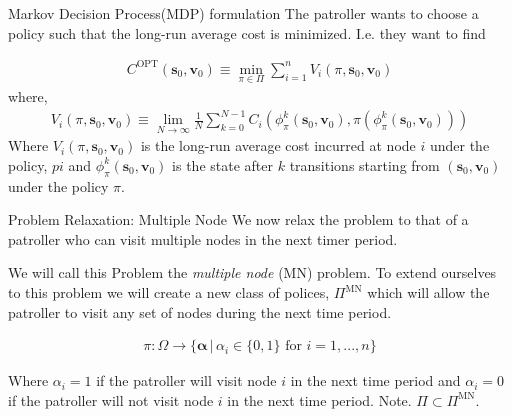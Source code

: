 \documentclass[10pt]{beamer}
\begin{document}
\begin{frame}{Markov Decision Process(MDP) formulation}
The patroller wants to choose a policy such that the long-run average cost is minimized. I.e. they want to find

\begin{align*}
C^{\text{OPT}}(\bm{s}_{0},\bm{v}_{0}) \equiv \min\limits_{\pi \in \Pi} \sum\limits_{i=1}^{n} V_{i}(\pi,\bm{s}_{0},\bm{v}_{0})
\end{align*}
where,
\begin{align*}
V_{i}(\pi,\bm{s}_{0},\bm{v}_{0}) \equiv \lim\limits_{N \rightarrow \infty} \frac{1}{N} \sum\limits_{k=0}^{N-1} C_{i}(\phi^{k}_{\pi}(\bm{s}_{0},\bm{v}_{0}),\pi(\phi^{k}_{\pi}(\bm{s}_{0},\bm{v}_{0})))
\end{align*}
Where $V_{i}(\pi,\bm{s}_{0},\bm{v}_{0})$ is the long-run average cost incurred at node $i$ under the policy, $pi$ and $\phi^{k}_{\pi}(\bm{s}_{0},\bm{v}_{0})$ is the state after $k$ transitions starting from $(\bm{s}_{0},\bm{v}_{0})$ under the policy $\pi$.

\end{frame}

\begin{frame}{Problem Relaxation: Multiple Node}
We now relax the problem to that of a patroller who can visit multiple nodes in the next timer period.

We will call this Problem the \textit{multiple node} (MN) problem. To extend ourselves to this problem we will create a new class of polices, $\Pi^{\text{MN}}$ which will allow the patroller to visit any set of nodes during the next time period.

\begin{align*}
\pi : \Omega \rightarrow \{\bm{\alpha} \, | \, \alpha_{i} \in \{0,1 \} \text{ for } i=1,...,n \}
\end{align*}

Where $\alpha_{i}=1$ if the patroller will visit node $i$ in the next time period and $\alpha_{i}=0$ if the patroller will not visit node $i$ in the next time period.
Note. $\Pi \subset \Pi^{\text{MN}}$.
\end{frame}
\end{document}
